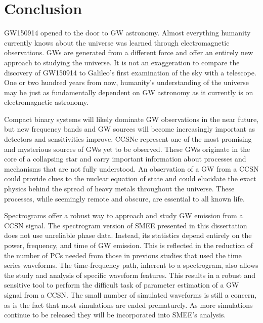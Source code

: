 \chapter{Conclusion}

GW150914 opened to the door to GW astronomy. Almost everything humanity currently knows about the universe was learned through electromagnetic observations. GWs are generated from a different force and offer an entirely new approach to studying the universe. It is not an exaggeration to compare the discovery of GW150914 to Galileo's first examination of the sky with a telescope. One or two hundred years from now, humanity's understanding of the universe may be just as fundamentally dependent on GW astronomy as it currently is on electromagnetic astronomy.

Compact binary systems will likely dominate GW observations in the near future, but new frequency bands and GW sources will become increasingly important as detectors and sensitivities improve. CCSNe represent one of the most promising and mysterious sources of GWs yet to be observed. These GWs originate in the core of a collapsing star and carry important information about processes and mechanisms that are not fully understood. An observation of a GW from a CCSN could provide clues to the nuclear equation of state and could elucidate the exact physics behind the spread of heavy metals throughout the universe. These processes, while seemingly remote and obscure, are essential to all known life.

Spectrograms offer a robust way to approach and study GW emission from a CCSN signal. The spectrogram version of SMEE presented in this dissertation does not use unreliable phase data. Instead, its statistics depend entirely on the power, frequency, and time of GW emission. This is reflected in the reduction of the number of PCs needed from those in previous studies that used the time series waveforms. The time-frequency path, inherent to a spectrogram, also allows the study and analysis of specific waveform features. This results in a robust and sensitive tool to perform the difficult task of parameter estimation of a GW signal from a CCSN. The small number of simulated waveforms is still a concern, as is the fact that most simulations are ended prematurely. As more simulations continue to be released they will be incorporated into SMEE's analysis.

